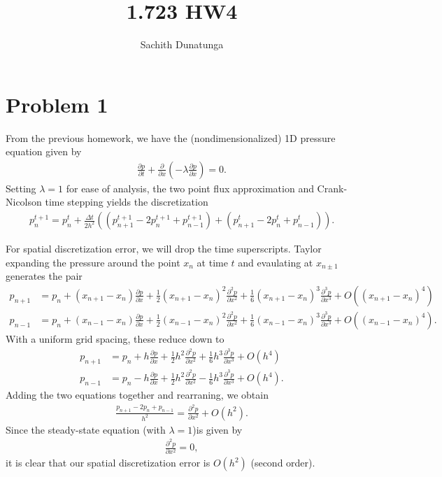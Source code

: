 \documentclass{article}
\title{1.723 HW4}
\author{Sachith  Dunatunga}
\begin{document}
\maketitle

\section{Problem 1}
From the previous homework, we have the (nondimensionalized) 1D pressure equation given by
\begin{align}
    \frac{\partial p}{\partial t} + \frac{\partial}{\partial x} \left( -\lambda \frac{\partial p}{\partial x} \right) = 0.
\end{align}
Setting $\lambda = 1$ for ease of analysis, the two point flux approximation and Crank-Nicolson time stepping yields the discretization
\begin{align}
   p_n^{t+1} = p_n^{t} + \frac{\Delta t}{2 h^2}\left( (p_{n+1}^{t+1} - 2p_n^{t+1} + p_{n-1}^{t+1}) +  (p_{n+1}^{t} - 2p_n^{t} + p_{n-1}^{t}) \right).
    \label{eqn:cn-disc}
\end{align}

For spatial discretization error, we will drop the time superscripts. Taylor expanding the pressure around the point $x_n$ at time $t$ and evaulating at $x_{n \pm 1}$ generates the pair
\begin{align}
    p_{n+1} &= p_n + (x_{n+1} - x_n) \frac{\partial p}{\partial x} + \frac{1}{2} (x_{n+1} - x_n)^2 \frac{\partial^2 p}{\partial x^2} + \frac{1}{6} (x_{n+1} - x_n)^3 \frac{\partial^3 p}{\partial x^3} + O((x_{n+1} - x_n)^4) \\
    p_{n-1} &= p_n + (x_{n-1} - x_n) \frac{\partial p}{\partial x} + \frac{1}{2} (x_{n-1} - x_n)^2 \frac{\partial^2 p}{\partial x^2} + \frac{1}{6} (x_{n-1} - x_n)^3 \frac{\partial^3 p}{\partial x^3} + O((x_{n-1} - x_n)^4).
\end{align}
With a uniform grid spacing, these reduce down to
\begin{align}
    p_{n+1} &= p_n + h \frac{\partial p}{\partial x} + \frac{1}{2} h^2 \frac{\partial^2 p}{\partial x^2} + \frac{1}{6} h^3 \frac{\partial^3 p}{\partial x^3} + O(h^4) \\
    p_{n-1} &= p_n - h \frac{\partial p}{\partial x} + \frac{1}{2} h^2 \frac{\partial^2 p}{\partial x^2} - \frac{1}{6} h^3 \frac{\partial^3 p}{\partial x^3} + O(h^4).
\end{align}
Adding the two equations together and rearraning, we obtain
\begin{align}
    \frac{p_{n+1} - 2 p_n + p_{n-1}}{h^2} = \frac{\partial^2 p}{\partial x^2} + O(h^2).
\end{align}
Since the steady-state equation (with $\lambda = 1$)is given by
\begin{align}
\frac{\partial^2 p}{\partial x^2} = 0,
\end{align}
it is clear that our spatial discretization error is $O(h^2)$ (second order).
\end{document}
